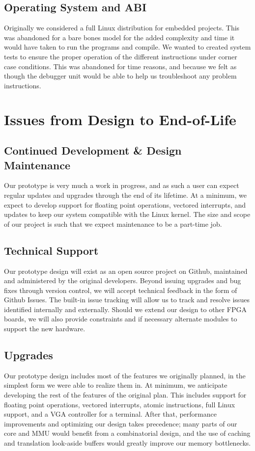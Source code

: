 \documentclass{article}
\begin{document}
\subsection{Operating System and ABI}
Originally we considered a full Linux distribution for embedded projects. This was abandoned for a bare bones model for the added complexity and time it would have taken to run the programs and compile. We wanted to created system tests to ensure the proper operation of the different instructions under corner case conditions. This was abandoned for time reasons, and because we felt as though the debugger unit would be able to help us troubleshoot any problem instructions.


\section{Issues from Design to End-of-Life}

\subsection{Continued Development \& Design Maintenance}
Our prototype is very much a work in progress, and as such a user can expect regular updates and upgrades through the end of its lifetime.  At a minimum, we expect to develop support for floating point operations, vectored interrupts, and updates to keep our system compatible with the Linux kernel.  The size and scope of our project is such that we expect maintenance to be a part-time job.

\subsection{Technical Support}
Our prototype design will exist as an open source project on Github, maintained and administered by the original developers.  Beyond issuing upgrades and bug fixes through version control, we will accept technical feedback in the form of Github Issues.  The built-in issue tracking will allow us to track and resolve issues identified internally and externally.  Should we extend our design to other FPGA boards, we will also provide constraints and if necessary alternate modules to support the new hardware.

\subsection{Upgrades}
Our prototype design includes most of the features we originally planned, in the simplest form we were able to realize them in.  At minimum, we anticipate developing the rest of the features of the original plan.  This includes support for floating point operations, vectored interrupts, atomic instructions, full Linux support, and a VGA controller for a terminal.  After that, performance improvements and optimizing our design takes precedence; many parts of our core and MMU would benefit from a combinatorial design, and the use of caching and translation look-aside buffers would greatly improve our memory bottlenecks.
\end{document}
